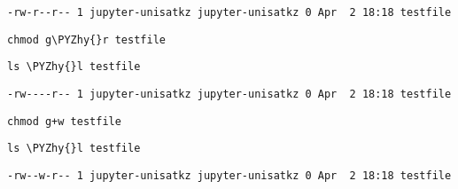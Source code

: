 \documentclass[11pt]{article}
\makeatletter
\def\PYZhy{\char`\-}
\newcommand{\boxspacing}{\kern\kvtcb@left@rule\kern\kvtcb@boxsep}
\newcommand{\prompt}[4]{
        \ttfamily\llap{{\color{#2}[#3]:\hspace{3pt}#4}}\vspace{-\baselineskip}
    }
\makeatother
\begin{document}
    \begin{Verbatim}[commandchars=\\\{\}]
-rw-r--r-- 1 jupyter-unisatkz jupyter-unisatkz 0 Apr  2 18:18 testfile
    \end{Verbatim}

    \begin{tcolorbox}[breakable, size=fbox, boxrule=1pt, pad at break*=1mm,colback=cellbackground, colframe=cellborder]
\prompt{In}{incolor}{111}{\boxspacing}
\begin{Verbatim}[commandchars=\\\{\}]
chmod g\PYZhy{}r testfile
\end{Verbatim}
\end{tcolorbox}

    \begin{tcolorbox}[breakable, size=fbox, boxrule=1pt, pad at break*=1mm,colback=cellbackground, colframe=cellborder]
\prompt{In}{incolor}{113}{\boxspacing}
\begin{Verbatim}[commandchars=\\\{\}]
ls \PYZhy{}l testfile
\end{Verbatim}
\end{tcolorbox}

    \begin{Verbatim}[commandchars=\\\{\}]
-rw----r-- 1 jupyter-unisatkz jupyter-unisatkz 0 Apr  2 18:18 testfile
    \end{Verbatim}

    \begin{tcolorbox}[breakable, size=fbox, boxrule=1pt, pad at break*=1mm,colback=cellbackground, colframe=cellborder]
\prompt{In}{incolor}{114}{\boxspacing}
\begin{Verbatim}[commandchars=\\\{\}]
chmod g+w testfile
\end{Verbatim}
\end{tcolorbox}

    \begin{tcolorbox}[breakable, size=fbox, boxrule=1pt, pad at break*=1mm,colback=cellbackground, colframe=cellborder]
\prompt{In}{incolor}{115}{\boxspacing}
\begin{Verbatim}[commandchars=\\\{\}]
ls \PYZhy{}l testfile
\end{Verbatim}
\end{tcolorbox}

    \begin{Verbatim}[commandchars=\\\{\}]
-rw--w-r-- 1 jupyter-unisatkz jupyter-unisatkz 0 Apr  2 18:18 testfile
    \end{Verbatim}
\end{document}
